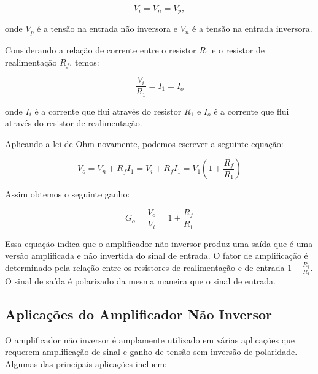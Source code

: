 \documentclass[12pt,twoside, a4paper, twocolumn]{article}
\begin{document}
\begin{equation}
    V_i = V_n = V_p,
\end{equation}

onde $V_p$ é a tensão na entrada não inversora e $V_n$ é a tensão na entrada inversora.

Considerando a relação de corrente entre o resistor $R_1$ e o resistor de realimentação $R_f$, temos:

\begin{equation}
    \frac{V_i}{R_1} = I_1 = I_o
\end{equation}

onde $I_i$ é a corrente que flui através do resistor $R_1$ e $I_o$ é a corrente que flui através do resistor de realimentação.

Aplicando a lei de Ohm novamente, podemos escrever a seguinte equação:

\begin{equation}
    V_o = V_n + R_f I_1 = V_i + R_f I_1 = V_1 (1 + \frac{R_f}{R_1})
\end{equation}

Assim obtemos o seguinte ganho:

\begin{equation}
    G_o = \frac{V_o}{V_i} = 1 + \frac{R_f}{R_1}
\end{equation}

Essa equação indica que o amplificador não inversor produz uma saída que é uma versão amplificada e não invertida do sinal de entrada. O fator de amplificação é determinado pela relação entre os resistores de realimentação e de entrada $1 + \frac{R_f}{R_1}$. O sinal de saída é polarizado da mesma maneira que o sinal de entrada.

\subsection{Aplicações do Amplificador Não Inversor}

O amplificador não inversor é amplamente utilizado em várias aplicações que requerem amplificação de sinal e ganho de tensão sem inversão de polaridade. Algumas das principais aplicações incluem:
\end{document}
